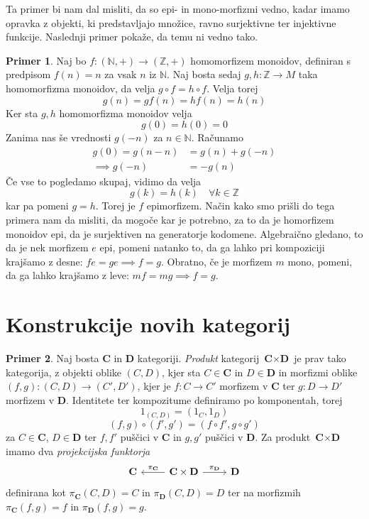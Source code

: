 \documentclass[12pt,a4paper]{book}
\theoremstyle{definition}
\theoremstyle{plain}
\theoremstyle{definition}
\newtheorem{primer}{Primer}[section]
\theoremstyle{remark}
\newcommand{\cat}[1]{\textbf{#1}}
\begin{document}
Ta primer bi nam dal misliti, da so epi- in mono-morfizmi vedno, kadar imamo opravka z objekti, ki predstavljajo množice, ravno surjektivne ter injektivne funkcije. Naslednji primer pokaže, da temu ni vedno tako.

\begin{primer}
Naj bo $f : (\mathbb{N},+) \to (\mathbb{Z},+)$ homomorfizem monoidov, definiran s predpisom $f(n) = n$ za vsak $n$ iz $\mathbb{N}$. Naj bosta sedaj $g,h: \mathbb{Z} \to M$ taka homomorfizma monoidov, da velja $g \circ f = h \circ f$. 
Velja torej $$g(n) = gf(n) = hf(n) = h(n)$$
Ker sta $g,h$ homomorfizma monoidov velja
$$g(0) = h(0) = 0$$
Zanima nas še vrednosti $g(-n)$ za $n \in \mathbb{N}$. 
Računamo 
\begin{align*}
g(0) = g(n - n) &= g(n) + g(-n) \\
\implies g(-n) &= -g(n)
\end{align*}
Če vse to pogledamo skupaj, vidimo da velja
$$g(k) = h(k) \quad \forall k \in \mathbb{Z}$$
kar pa pomeni $g = h$. Torej je $f$ epimorfizem. Način kako smo prišli do tega primera nam da misliti, da mogoče kar je potrebno, za to da je homorfizem monoidov epi, da je surjektiven na generatorje kodomene.
Algebraično gledano, to da je nek morfizem $e$ epi, pomeni natanko to, da ga lahko pri kompoziciji krajšamo z desne: $fe = ge \implies f=g$. Obratno, če je morfizem $m$ mono, pomeni, da ga lahko krajšamo z leve: $mf = mg \implies f = g$.

\end{primer}


\section{Konstrukcije novih kategorij}

\begin{primer}
Naj bosta $\cat{C}$ in $\cat{D}$ kategoriji. \emph{Produkt} kategorij $\cat{C} \times \cat{D}$ je prav tako kategorija, z objekti oblike $(C,D)$, kjer sta $C \in \cat{C}$ in $D \in \cat{D}$ in morfizmi oblike $(f,g) : (C,D) \to (C',D')$, kjer je $f : C \to C'$ morfizem v $\cat{C}$ ter $g : D \to D'$ morfizem v $\cat{D}$. Identitete ter kompozitume definiramo po komponentah, torej
\begin{equation*}
1_{(C,D)} = (1_C,1_D)
\end{equation*}
\begin{equation*}
(f,g) \circ (f',g') = (f \circ f', g \circ g')
\end{equation*}
za $C \in \cat{C}$, $D \in \cat{D}$ ter $f,f'$ puščici v $\cat{C}$ in $g,g'$ puščici v $\cat{D}$.
Za produkt $\cat{C} \times \cat{D}$ imamo dva \textit{projekcijska funktorja} 
\[
\begin{tikzcd}
\cat{C} & \arrow[l, "\pi_{\cat{C}}"'] \cat{C} \times \cat{D} \arrow[r, "\pi_{\cat{D}}"] & \cat{D}
\end{tikzcd}
\]
definirana kot $\pi_{\cat{C}}(C,D) = C$ in $\pi_{\cat{D}}(C,D) = D$ ter na morfizmih $\pi_{\cat{C}}(f,g) = f$ in $\pi_{\cat{D}}(f,g) = g$.
\end{primer}
\end{document}
